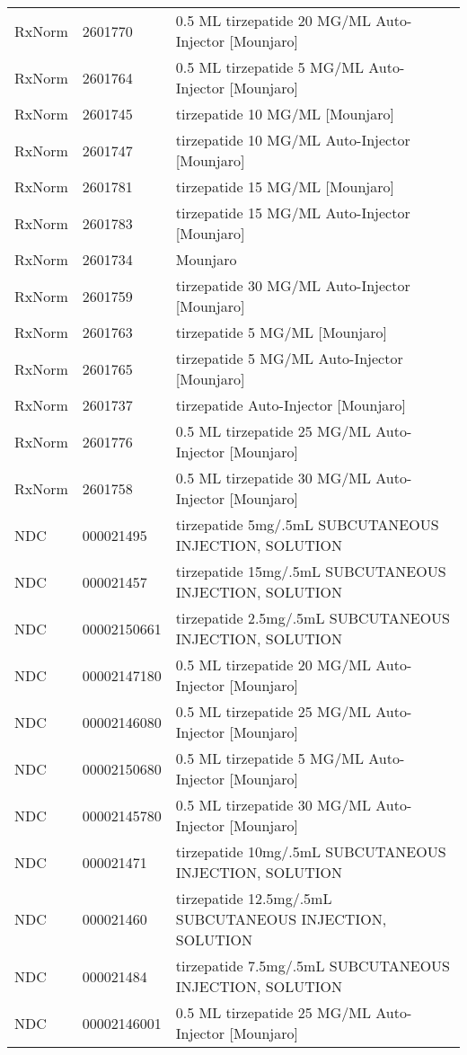 \begin{longtable}{p{}p{}p{}}
  RxNorm & 2601770 & 0.5 ML tirzepatide 20 MG/ML Auto-Injector [Mounjaro] \\ 
  RxNorm & 2601764 & 0.5 ML tirzepatide 5 MG/ML Auto-Injector [Mounjaro] \\ 
  RxNorm & 2601745 & tirzepatide 10 MG/ML [Mounjaro] \\ 
  RxNorm & 2601747 & tirzepatide 10 MG/ML Auto-Injector [Mounjaro] \\ 
  RxNorm & 2601781 & tirzepatide 15 MG/ML [Mounjaro] \\ 
  RxNorm & 2601783 & tirzepatide 15 MG/ML Auto-Injector [Mounjaro] \\ 
  RxNorm & 2601734 & Mounjaro \\ 
  RxNorm & 2601759 & tirzepatide 30 MG/ML Auto-Injector [Mounjaro] \\ 
  RxNorm & 2601763 & tirzepatide 5 MG/ML [Mounjaro] \\ 
  RxNorm & 2601765 & tirzepatide 5 MG/ML Auto-Injector [Mounjaro] \\ 
  RxNorm & 2601737 & tirzepatide Auto-Injector [Mounjaro] \\ 
  RxNorm & 2601776 & 0.5 ML tirzepatide 25 MG/ML Auto-Injector [Mounjaro] \\ 
  RxNorm & 2601758 & 0.5 ML tirzepatide 30 MG/ML Auto-Injector [Mounjaro] \\ 
  NDC & 000021495 & tirzepatide 5mg/.5mL SUBCUTANEOUS INJECTION, SOLUTION \\ 
  NDC & 000021457 & tirzepatide 15mg/.5mL SUBCUTANEOUS INJECTION, SOLUTION \\ 
  NDC & 00002150661 & tirzepatide 2.5mg/.5mL SUBCUTANEOUS INJECTION, SOLUTION \\ 
  NDC & 00002147180 & 0.5 ML tirzepatide 20 MG/ML Auto-Injector [Mounjaro] \\ 
  NDC & 00002146080 & 0.5 ML tirzepatide 25 MG/ML Auto-Injector [Mounjaro] \\ 
  NDC & 00002150680 & 0.5 ML tirzepatide 5 MG/ML Auto-Injector [Mounjaro] \\ 
  NDC & 00002145780 & 0.5 ML tirzepatide 30 MG/ML Auto-Injector [Mounjaro] \\ 
  NDC & 000021471 & tirzepatide 10mg/.5mL SUBCUTANEOUS INJECTION, SOLUTION \\ 
  NDC & 000021460 & tirzepatide 12.5mg/.5mL SUBCUTANEOUS INJECTION, SOLUTION \\ 
  NDC & 000021484 & tirzepatide 7.5mg/.5mL SUBCUTANEOUS INJECTION, SOLUTION \\ 
  NDC & 00002146001 & 0.5 ML tirzepatide 25 MG/ML Auto-Injector [Mounjaro] \\ 

\end{longtable}
